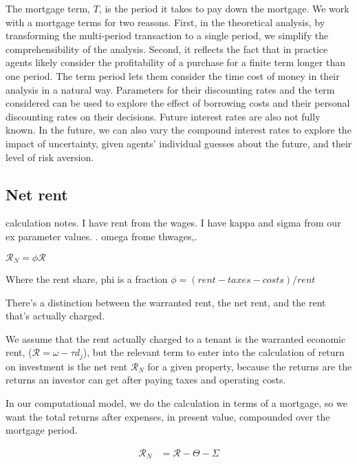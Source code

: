 The {mortgage term}, $T$, is the period it takes to pay down the mortgage. We work with a mortgage terms for two reasons. First, in the theoretical analysis, by transforming the multi-period transaction to a single period, we simplify the comprehensibility of the analysis. Second, it reflects the fact that in practice agents  likely consider the profitability of a purchase for a finite term longer than one period. The term period lets them consider the time cost of money in their analysis in a natural way. Parameters for their discounting rates and the term considered can be used to explore the effect of borrowing costs and their personal discounting rates on their decisions. Future interest rates are also not fully known. In the future, we can also vary the compound interest rates to explore the impact of uncertainty, given agents' individual guesses about the future, and their level of risk aversion.


\subsection{Net rent}\label{SS:NetRent}

calculation notes. I have rent from the wages. I have kappa and sigma from our ex parameter values. . omega frome thwages,. 


$\mathcal{R}_N = \phi \mathcal{R}$

Where the \gls{rent share}, phi is a fraction
$\phi = (rent-taxes-costs) /rent$ 

There's a distinction between the warranted rent, the net rent, and the rent that's actually charged.

We assume that the  rent  actually charged to a tenant is the warranted economic rent, ($\mathcal{R}= \omega - \tau d_j$), but the relevant term to enter into the calculation of return on investment is the net rent $\mathcal{R}_N$ for a given property, because the returns are the returns an investor can get after paying taxes and operating costs.

In our computational model, we do the calculation in terms of a mortgage, so we want the total returns after expenses, in present value, compounded over the mortgage  period.

\begin{align}
\mathcal{R}_N &= \mathcal{R} - \Theta - \Sigma 
\end{align}


